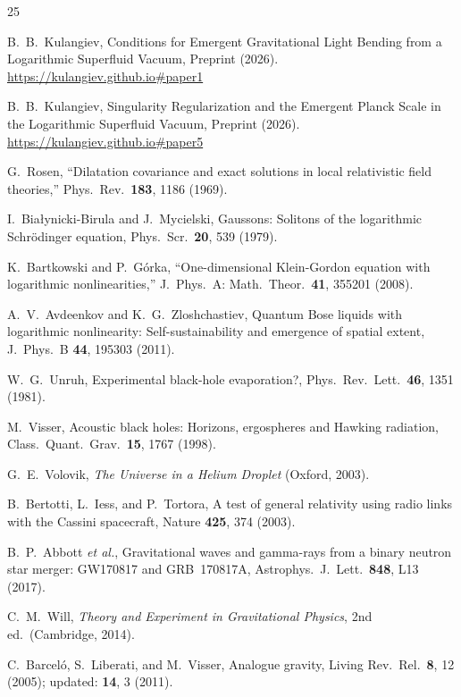 \documentclass[12pt, a4paper]{article}
\begin{document}
\begin{thebibliography}{25}

B.~B.~Kulangiev,
Conditions for Emergent Gravitational Light Bending from a Logarithmic Superfluid Vacuum,
Preprint (2026).
\url{https://kulangiev.github.io#paper1}

B.~B.~Kulangiev,
Singularity Regularization and the Emergent Planck Scale in the Logarithmic Superfluid Vacuum,
Preprint (2026).
\url{https://kulangiev.github.io#paper5}

G.~Rosen,
``Dilatation covariance and exact solutions in local relativistic field theories,''
Phys.\ Rev.\ \textbf{183}, 1186 (1969).

I.~Bia\l{}ynicki-Birula and J.~Mycielski,
Gaussons: Solitons of the logarithmic Schr\"{o}dinger equation,
Phys.\ Scr.\ \textbf{20}, 539 (1979).

K.~Bartkowski and P.~G\'{o}rka,
``One-dimensional Klein-Gordon equation with logarithmic nonlinearities,''
J.\ Phys.\ A: Math.\ Theor.\ \textbf{41}, 355201 (2008).

A.~V.~Avdeenkov and K.~G.~Zloshchastiev,
Quantum Bose liquids with logarithmic nonlinearity: Self-sustainability and emergence of spatial extent,
J.\ Phys.\ B \textbf{44}, 195303 (2011).

W.~G.~Unruh,
Experimental black-hole evaporation?,
Phys.\ Rev.\ Lett.\ \textbf{46}, 1351 (1981).

M.~Visser,
Acoustic black holes: Horizons, ergospheres and Hawking radiation,
Class.\ Quant.\ Grav.\ \textbf{15}, 1767 (1998).

G.~E.~Volovik,
\emph{The Universe in a Helium Droplet} (Oxford, 2003).

B.~Bertotti, L.~Iess, and P.~Tortora,
A test of general relativity using radio links with the Cassini spacecraft,
Nature \textbf{425}, 374 (2003).

B.~P.~Abbott \emph{et al.},
Gravitational waves and gamma-rays from a binary neutron star merger: GW170817 and GRB~170817A,
Astrophys.\ J.\ Lett.\ \textbf{848}, L13 (2017).

C.~M.~Will,
\emph{Theory and Experiment in Gravitational Physics}, 2nd ed.\ (Cambridge, 2014).

C.~Barcel\'{o}, S.~Liberati, and M.~Visser,
Analogue gravity,
Living Rev.\ Rel.\ \textbf{8}, 12 (2005);
updated: \textbf{14}, 3 (2011).

\end{thebibliography}
\end{document}

